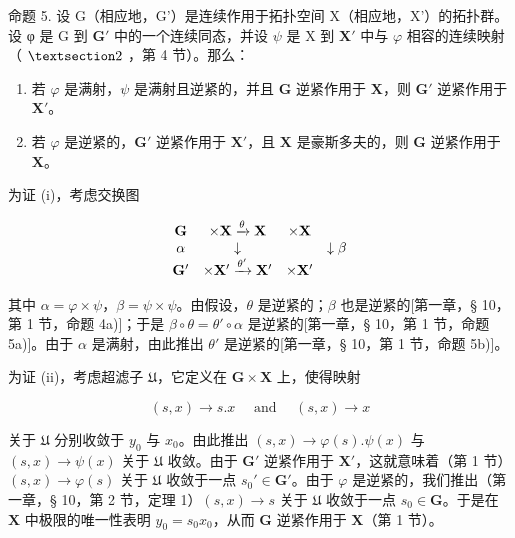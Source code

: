 命题 5. 设 G（相应地，G'）是连续作用于拓扑空间 X（相应地，X'）的拓扑群。设 φ 是 G 到 \(\mathbf{G}'\) 中的一个连续同态，并设 \(\psi\) 是 X 到 \(\mathbf{X}'\) 中与 \(\varphi\) 相容的连续映射（ \(\S 2\) ，第 4 节）。那么：

\begin{enumerate}
\def\labelenumi{(\roman{enumi})}
\item
  若 \(\varphi\) 是满射，\(\psi\) 是满射且逆紧的，并且 \(\mathbf{G}\) 逆紧作用于 \(\mathbf{X}\)，则 \(\mathbf{G}'\) 逆紧作用于 \(\mathbf{X}'\)。
\item
  若 \(\varphi\) 是逆紧的，\(\mathbf{G}'\) 逆紧作用于 \(\mathbf{X}'\)，且 \(\mathbf{X}\) 是豪斯多夫的，则 \(\mathbf{G}\) 逆紧作用于 \(\mathbf{X}\)。
\end{enumerate}

为证 (i)，考虑交换图

\[
\begin{array}{c c c c} \mathbf {G} & \times \mathbf {X} \xrightarrow {\theta} \mathbf {X} & \times \mathbf {X} \\ \alpha & \downarrow & & \downarrow \beta \\ \mathbf {G} ^ {\prime} & \times \mathbf {X} ^ {\prime} \xrightarrow {\theta^ {\prime}} \mathbf {X} ^ {\prime} & \times \mathbf {X} ^ {\prime} \end{array}
\]

其中 \(\alpha = \varphi \times \psi\)，\(\beta = \psi \times \psi\)。由假设，\(\theta\) 是逆紧的；\(\beta\) 也是逆紧的{[}第一章，§ 10，第 1 节，命题 4a){]}；于是 \(\beta \circ \theta = \theta' \circ \alpha\) 是逆紧的{[}第一章，§ 10，第 1 节，命题 5a){]}。由于 \(\alpha\) 是满射，由此推出 \(\theta'\) 是逆紧的{[}第一章，§ 10，第 1 节，命题 5b){]}。

为证 (ii)，考虑超滤子 \(\mathfrak{U}\)，它定义在 \(\mathbf{G} \times \mathbf{X}\) 上，使得映射

\[
(s, x) \rightarrow s. x \quad \text { and } \quad (s, x) \rightarrow x
\]

关于 \(\mathfrak{U}\) 分别收敛于 \(y_0\) 与 \(x_0\)。由此推出 \((s, x) \to \varphi(s). \psi(x)\) 与 \((s, x) \to \psi(x)\) 关于 \(\mathfrak{U}\) 收敛。由于 \(\mathbf{G}'\) 逆紧作用于 \(\mathbf{X}'\)，这就意味着（第 1 节）\((s, x) \to \varphi(s)\) 关于 \(\mathfrak{U}\) 收敛于一点 \(s_0' \in \mathbf{G}'\)。由于 \(\varphi\) 是逆紧的，我们推出（第一章，§ 10，第 2 节，定理 1）\((s, x) \to s\) 关于 \(\mathfrak{U}\) 收敛于一点 \(s_0 \in \mathbf{G}\)。于是在 \(\mathbf{X}\) 中极限的唯一性表明 \(y_0 = s_0 x_0\)，从而 \(\mathbf{G}\) 逆紧作用于 \(\mathbf{X}\)（第 1 节）。

